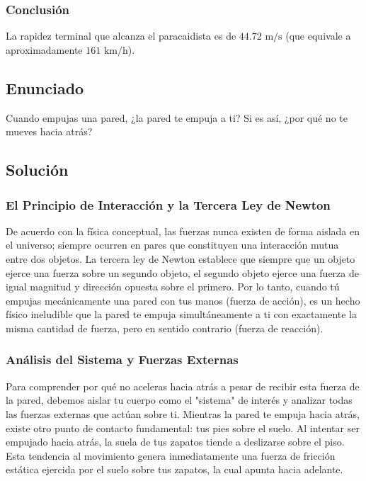 \documentclass[12pt]{article}
\begin{document}
\subsubsection*{Conclusión}
La rapidez terminal que alcanza el paracaidista es de $44.72 \text{ m/s}$ (que equivale a aproximadamente $161 \text{ km/h}$).

\newpage

\subsection*{Enunciado}
Cuando empujas una pared, ¿la pared te empuja a ti? Si es así, ¿por qué no te mueves hacia atrás?

\subsection*{Solución}

\subsubsection*{El Principio de Interacción y la Tercera Ley de Newton}
De acuerdo con la física conceptual, las fuerzas nunca existen de forma aislada en el universo; siempre ocurren en pares que constituyen una interacción mutua entre dos objetos. La tercera ley de Newton establece que siempre que un objeto ejerce una fuerza sobre un segundo objeto, el segundo objeto ejerce una fuerza de igual magnitud y dirección opuesta sobre el primero. Por lo tanto, cuando tú empujas mecánicamente una pared con tus manos (fuerza de acción), es un hecho físico ineludible que la pared te empuja simultáneamente a ti con exactamente la misma cantidad de fuerza, pero en sentido contrario (fuerza de reacción). 

\subsubsection*{Análisis del Sistema y Fuerzas Externas}
Para comprender por qué no aceleras hacia atrás a pesar de recibir esta fuerza de la pared, debemos aislar tu cuerpo como el "sistema" de interés y analizar todas las fuerzas externas que actúan sobre ti. 
Mientras la pared te empuja hacia atrás, existe otro punto de contacto fundamental: tus pies sobre el suelo. Al intentar ser empujado hacia atrás, la suela de tus zapatos tiende a deslizarse sobre el piso. Esta tendencia al movimiento genera inmediatamente una fuerza de fricción estática ejercida por el suelo sobre tus zapatos, la cual apunta hacia adelante. 
\end{document}
